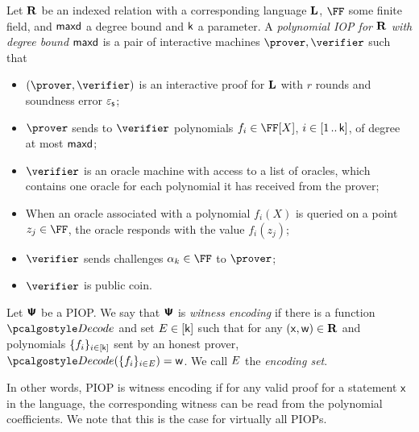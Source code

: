 \documentclass[runningheads,11pt]{llncs}
\begin{document}
\begin{definition}
  \label{def:piop}
  Let $\mathbf{R}$ be an indexed relation with a corresponding language $\mathbf{L}$, $\FF$
  some finite field, and $\mathsf{maxd}$ a degree bound and $\mathsf{k}$ a parameter. A
  \emph{polynomial IOP for $\mathbf{R}$ with degree bound $\mathsf{maxd}$} is a pair of
  interactive machines $\prover, \verifier$ such that
\begin{itemize}
\item $(\prover, \verifier)$ is an interactive proof for $\mathbf{L}$ with $r$ rounds
  and soundness error $\varepsilon_{\mathsf{s}}$;
\item $\prover$ sends to $\verifier$ polynomials $f_i \in \FF[X]$,
  $i \in [1 \, .. \, \mathsf{k}]$, of degree at most $\mathsf{maxd}$;
\item $\verifier$ is an oracle machine with access to a list of oracles, which
  contains one oracle for each polynomial it has received from the prover;
\item When an oracle associated with a polynomial $f_i(X)$ is queried on a point
  $z_j \in \FF$, the oracle responds with the value $f_i(z_j)$; 
\item $\verifier$ sends challenges $\alpha_k \in \FF$ to $\prover$;
\item $\verifier$ is public coin.
\end{itemize}
\end{definition}


\begin{definition}
  \label{def:wepiop}
  Let $\bm{\mathsf{\Psi}}$ be a PIOP.  We say that $\bm{\mathsf{\Psi}}$ is \emph{witness encoding} if there is
  a function $\decode$ and set $E \in [\mathsf{k}]$ such that for any
  $(\mathsf{x}, \mathsf{w}) \in \mathbf{R}$ and polynomials $\{f_i\}_{i \in [\mathsf{k}]}$ sent by an
  honest prover, $\decode(\smallset{f_i}_{i \in \encset}) = \wit$. We call $E$ the
  \emph{encoding set}.
\end{definition}
In other words, PIOP is witness encoding if for any valid proof for a statement
$\mathsf{x}$ in the language, the corresponding witness can be read from the
polynomial coefficients. We note that this is the case for virtually all
PIOPs. 
\end{document}
